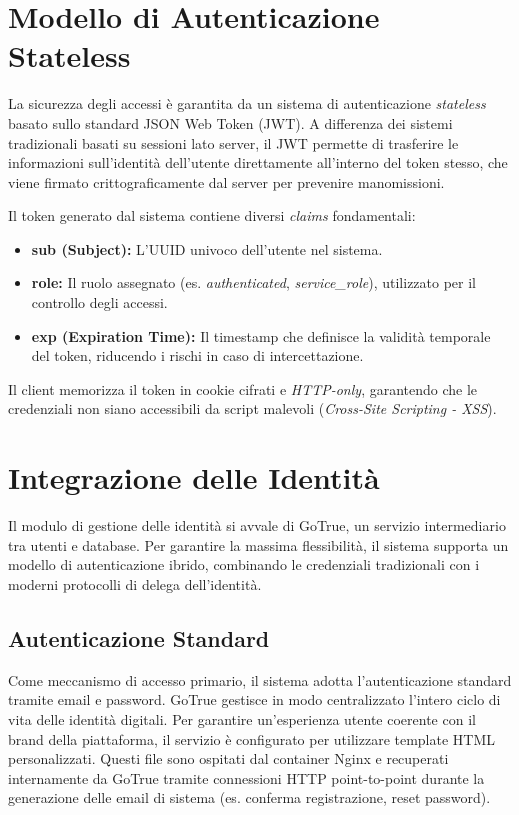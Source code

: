\documentclass[12pt,a4paper]{report}
\begin{document}
\section{Modello di Autenticazione Stateless}
La sicurezza degli accessi è garantita da un sistema di autenticazione
\textit{stateless} basato sullo standard JSON Web Token (JWT). A differenza dei
sistemi tradizionali basati su sessioni lato server, il JWT permette di
trasferire le informazioni sull'identità dell'utente direttamente all'interno
del token stesso, che viene firmato crittograficamente dal server per
prevenire manomissioni.

Il token generato dal sistema contiene diversi \textit{claims} fondamentali:
\begin{itemize}
  \item \textbf{sub (Subject):} L'UUID univoco dell'utente nel sistema.
  \item \textbf{role:} Il ruolo assegnato (es. \textit{authenticated},
    \textit{service\_role}), utilizzato per il controllo degli accessi.
  \item \textbf{exp (Expiration Time):} Il timestamp che definisce la validità
    temporale del token, riducendo i rischi in caso di intercettazione.
\end{itemize}
Il client memorizza il token in cookie cifrati e \textit{HTTP-only}, garantendo
che le credenziali non siano accessibili da script malevoli (\textit{Cross-Site
Scripting - XSS}).

\section{Integrazione delle Identità}
Il modulo di gestione delle identità si avvale di GoTrue, un servizio
intermediario tra utenti e database. Per garantire la massima
flessibilità, il sistema supporta un modello di autenticazione
ibrido, combinando le credenziali tradizionali con i moderni
protocolli di delega dell'identità.

\subsection{Autenticazione Standard}
Come meccanismo di accesso primario, il sistema adotta
l'autenticazione standard tramite email e password. GoTrue gestisce
in modo centralizzato l'intero ciclo di vita delle identità digitali.
Per garantire un'esperienza utente coerente con il brand della
piattaforma, il servizio è configurato per utilizzare template HTML
personalizzati. Questi file sono ospitati dal container Nginx e
recuperati internamente da GoTrue tramite connessioni HTTP
point-to-point durante la generazione delle email di sistema (es.
conferma registrazione, reset password).
\end{document}
